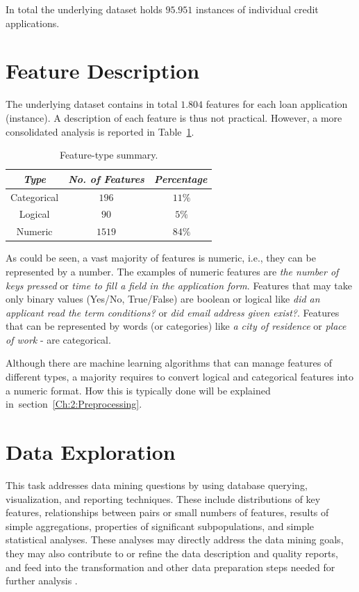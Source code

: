 In total the underlying dataset holds \(95.951\) instances of individual credit applications.

\section{Feature Description}\label{Ch:2:FeatureDesc}
The underlying dataset contains in total \(1.804\) features for each loan application (instance). A description of each feature is thus not practical. However, a more consolidated analysis is reported in Table~\ref{tab:feature-summary}. 

\begin{table}[h!]
  \begin{center}
    \caption{Feature-type summary.}
    \label{tab:feature-summary}
    \begin{tabular}{|c|c|c|}\hline
    \textit{Type} & \textit{No. of Features} & \textit{Percentage} \\
      \hline
     Categorical & \(196\) & \(~11\%\) \\ 
     \hline
     Logical & \(90\) &  \(~5\%\) \\
     \hline
     Numeric & \(1519\) &  \(~84\%\) \\
     \hline
    \end{tabular}
  \end{center}
\end{table}

As could be seen, a vast majority of features is numeric, i.e., they can be represented by a number. The examples of numeric features are \textit{the number of keys pressed} or \textit{time to fill a field in the application form}. Features that may take only binary values (Yes/No, True/False) are boolean or logical like \textit{did an applicant read the term conditions?} or \textit{did email address given exist?}. Features that can be represented by words (or categories) like \textit{a city of residence} or \textit{place of work} - are categorical.

Although there are machine learning algorithms that can manage features of different types, a majority requires to convert logical and categorical features into a numeric format. How this is typically done will be explained in~section~\ref{Ch:2:Preprocessing}.

\section{Data Exploration}\label{Ch:2:Exploration}
This task addresses data mining questions by using database querying, visualization, and reporting techniques. These include distributions of key features, relationships between pairs or small numbers of features, results of simple aggregations, properties of significant subpopulations, and simple statistical analyses. These analyses may directly address the data mining goals, they may also contribute to or refine the data description and quality reports, and feed into the transformation and other data preparation steps needed for further analysis \cite{crisp}.

